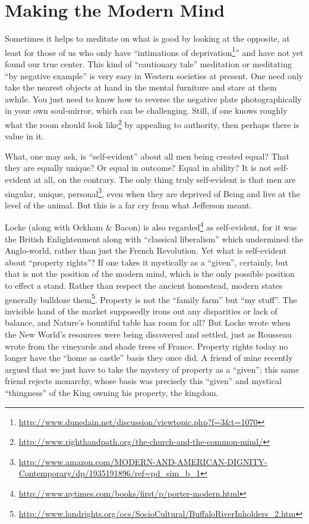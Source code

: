 \section{Making the Modern Mind}

Sometimes it helps to meditate on what is good by looking at the opposite, at least for those of us who only have ``intimations of deprivation\footnote{\url{http://www.dunedain.net/discussion/viewtopic.php?f=3\&t=1070}}'' and have not yet found our true center. This kind of ``cautionary tale'' meditation or meditating ``by negative example'' is very easy in Western societies at present. One need only take the nearest objects at hand in the mental furniture and stare at them awhile. You just need to know how to reverse the negative plate photographically in your own soul-mirror, which can be challenging. Still, if one knows roughly what the room should look like\footnote{\url{http://www.righthandpath.org/the-church-and-the-common-mind/}} by appealing to authority, then perhaps there is value in it.

What, one may ask, is ``self-evident'' about all men being created equal? That they are equally unique? Or equal in outcome? Equal in ability? It is not self-evident at all, on the contrary. The only thing truly self-evident is that men are singular, unique, personal\footnote{\url{http://www.amazon.com/MODERN-AND-AMERICAN-DIGNITY-Contemporary/dp/1935191896/ref=pd_sim_b_1}}, even when they are deprived of Being and live at the level of the animal. But this is a far cry from what Jefferson meant.

Locke (along with Ockham \& Bacon) is also regarded\footnote{\url{http://www.nytimes.com/books/first/p/porter-modern.html}} as self-evident, for it was the British Enlightenment along with ``classical liberalism'' which undermined the Anglo-world, rather than just the French Revolution. Yet what is self-evident about ``property rights''? If one takes it mystically as a ``given'', certainly, but that is not the position of the modern mind, which is the only possible position to effect a stand. Rather than respect the ancient homestead, modern states generally bulldoze them\footnote{\url{http://www.landrights.org/ocs/SocioCultural/BuffaloRiverInholders_2.htm}}. Property is not the ``family farm'' but ``my stuff''. The invisible hand of the market supposedly irons out any disparities or lack of balance, and Nature's bountiful table has room for all? But Locke wrote when the New World's resources were being discovered and settled, just as Rousseau wrote from the vineyards and shade trees of France. Property rights today no longer have the ``home as castle'' basis they once did. A friend of mine recently argued that we just have to take the mystery of property as a ``given''; this same friend rejects monarchy, whose basis was precisely this ``given'' and mystical ``thingness'' of the King owning his property, the kingdom.

